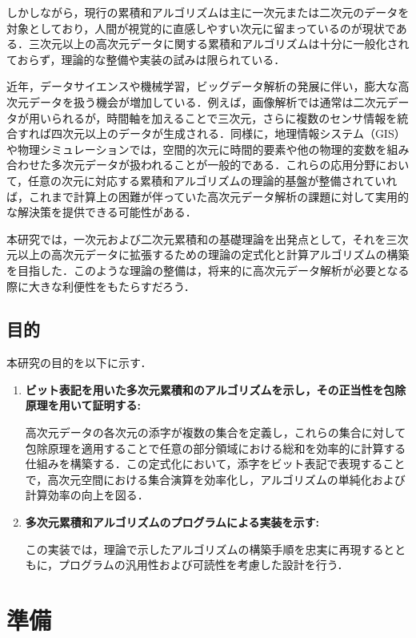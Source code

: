 \documentclass[12pt]{jsreport}
\theoremstyle{plain} %
\theoremstyle{definition}
\begin{document}
しかしながら，現行の累積和アルゴリズムは主に一次元または二次元のデータを対象としており，人間が視覚的に直感しやすい次元に留まっているのが現状である．三次元以上の高次元データに関する累積和アルゴリズムは十分に一般化されておらず，理論的な整備や実装の試みは限られている．

近年，データサイエンスや機械学習，ビッグデータ解析の発展に伴い，膨大な高次元データを扱う機会が増加している．例えば，画像解析では通常は二次元データが用いられるが，時間軸を加えることで三次元，さらに複数のセンサ情報を統合すれば四次元以上のデータが生成される．同様に，地理情報システム（GIS）や物理シミュレーションでは，空間的次元に時間的要素や他の物理的変数を組み合わせた多次元データが扱われることが一般的である．これらの応用分野において，任意の次元に対応する累積和アルゴリズムの理論的基盤が整備されていれば，これまで計算上の困難が伴っていた高次元データ解析の課題に対して実用的な解決策を提供できる可能性がある．

本研究では，一次元および二次元累積和の基礎理論を出発点として，それを三次元以上の高次元データに拡張するための理論の定式化と計算アルゴリズムの構築を目指した．このような理論の整備は，将来的に高次元データ解析が必要となる際に大きな利便性をもたらすだろう．

\section{目的}

本研究の目的を以下に示す．

\begin{enumerate}
    \item \textbf{ビット表記を用いた多次元累積和のアルゴリズムを示し，その正当性を包除原理を用いて証明する:}


     高次元データの各次元の添字が複数の集合を定義し，これらの集合に対して包除原理を適用することで任意の部分領域における総和を効率的に計算する仕組みを構築する．この定式化において，添字をビット表記で表現することで，高次元空間における集合演算を効率化し，アルゴリズムの単純化および計算効率の向上を図る．

    \item \textbf{多次元累積和アルゴリズムのプログラムによる実装を示す:}

    この実装では，理論で示したアルゴリズムの構築手順を忠実に再現するとともに，プログラムの汎用性および可読性を考慮した設計を行う．

\end{enumerate}

\chapter{準備}
\end{document}
